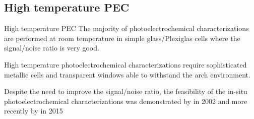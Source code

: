 \documentclass[10pt,compress]{beamer}
\begin{document}
\subsection{High temperature PEC}
    \begin{frame}[allowframebreaks=1.0]{High temperature PEC}
        The majority of photoelectrochemical characterizations are performed at 
        room temperature in simple glass/Plexiglas cells where the signal/noise 
        ratio is very good.
        
        High temperature photoelectrochemical characterizations 
        require sophisticated metallic cells and transparent windows 
        able to withstand the arch environment. 
        
        Despite the need to improve the signal/noise ratio, the feasibility of 
        the in-situ photoelectrochemical characterizations was demonstrated by 
        \citet{bojinov2002} in 2002 and more recently by \citet{skocic2016} in 2015 


\end{frame}
\end{document}
